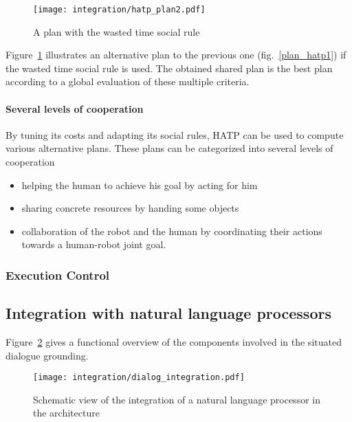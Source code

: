 \begin{figure}[htbp]
  \centering
  \texttt{[image: integration/hatp\_plan2.pdf]}
  \caption{A plan with the wasted time social rule}
  \label{plan_hatp2}
\end{figure}

Figure~\ref{plan_hatp2} illustrates an alternative plan to the previous one
(fig.~\ref{plan_hatp1}) if the wasted time social rule is used.  The obtained
shared plan is the best plan according to a global evaluation of these multiple
criteria.

\paragraph{Several levels of cooperation} By tuning its costs and adapting its
social rules, HATP can be used to compute various alternative plans. These
plans can be categorized into several levels of cooperation

\begin{itemize}

    \item helping the human to achieve his goal by acting for him

    \item sharing concrete resources by handing some objects

    \item collaboration of the robot and the human by coordinating their
    actions towards a human-robot joint goal.

\end{itemize}


\subsubsection{Execution Control}

\subsection{Integration with natural language processors}

Figure~\ref{fig|dialog-integration} gives a functional overview of the
components involved in the situated dialogue grounding.

\begin{figure}
    \centering
    \texttt{[image: integration/dialog\_integration.pdf]}
    \caption{Schematic view of the integration of a natural language processor
    in the architecture}
    \label{fig|dialog-integration}
\end{figure}

